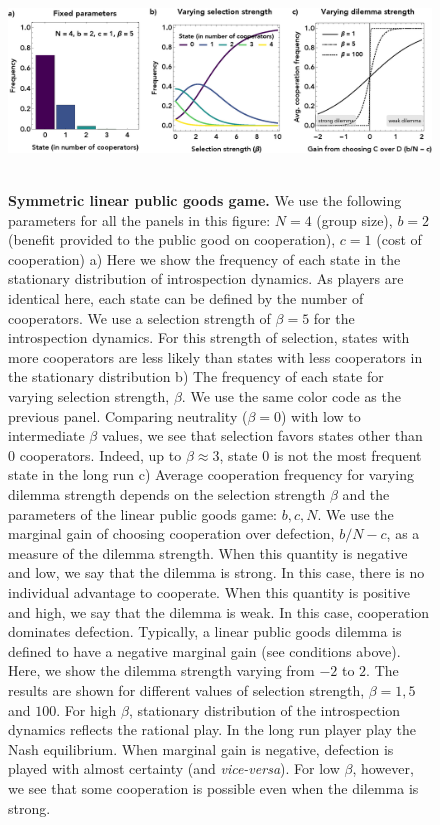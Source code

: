 \documentclass[11pt]{article}
\theoremstyle{plainCl1}
\theoremstyle{plainCl2}
\begin{document}
\begin{figure}
\centering
\includegraphics[width =  \textwidth]{figures/figure1.eps}~\\[0.4cm]
\caption{\onehalfspacing
\textbf{Symmetric linear public goods game.}
We use the following parameters for all the panels in this figure: $N = 4$ (group size), $b = 2$ (benefit provided to the public good on cooperation), $c = 1$ (cost of cooperation) a) Here we show the frequency of each state in the stationary distribution of introspection dynamics. As players are identical here, each state can be defined by the number of cooperators. We use a selection strength of $\beta = 5$ for the introspection dynamics. For this strength of selection, states with more cooperators are less likely than states with less cooperators in the stationary distribution b) The frequency of each state for varying selection strength, $\beta$. We use the same color code as the previous panel. Comparing neutrality ($\beta = 0$) with low to intermediate $\beta$ values, we see that selection favors states other than 0 cooperators. Indeed, up to $\beta \approx 3$, state $0$ is not the most frequent state in the long run c) Average cooperation frequency for varying dilemma strength depends on the selection strength $\beta$ and the parameters of the linear public goods game: $b,c, N$. We use the marginal gain of choosing cooperation over defection, $b/N - c$, as a measure of the dilemma strength. When this quantity is negative and low, we say that the dilemma is strong. In this case, there is no individual advantage to cooperate. When this quantity is positive and high, we say that the dilemma is weak. In this case, cooperation dominates defection. Typically, a linear public goods dilemma is defined to have a negative marginal gain (see conditions above). Here, we show the dilemma strength varying from $-2$ to $2$. The results are shown for different values of selection strength, $\beta = 1, 5$ and $100$. For high $\beta$, stationary distribution of the introspection dynamics reflects the rational play. In the long run player play the Nash equilibrium. When marginal gain is negative, defection is played with almost certainty (and \emph{vice-versa}). For low $\beta$, however, we see that some cooperation is possible even when the dilemma is strong. }
\label{Fig:LPGG-symmetric}
\end{figure}
\end{document}
